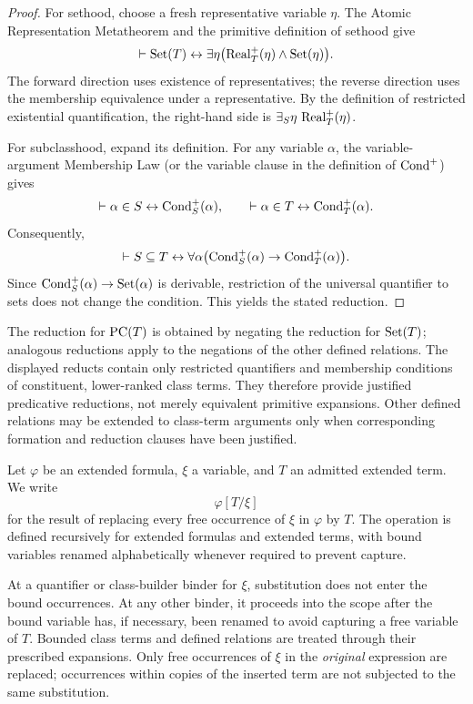 \begin{proof}
For sethood, choose a fresh representative variable \(\eta\).
The Atomic Representation Metatheorem and the primitive definition
of sethood give
\[
\vdash
\operatorname{Set}(T)
\leftrightarrow
\exists\eta\bigl(
\operatorname{Real}^+_T(\eta)\land\operatorname{Set}(\eta)
\bigr).
\]
The forward direction uses existence of representatives; the reverse
direction uses the membership equivalence under a representative.
By the definition of restricted existential quantification, the
right-hand side is \(\exists_S\eta\,\operatorname{Real}^+_T(\eta)\).

For subclasshood, expand its definition. For any variable \(\alpha\),
the variable-argument Membership Law (or the variable clause in
the definition of \(\operatorname{Cond}^+\)) gives
\[
\vdash
\alpha\in S\leftrightarrow\operatorname{Cond}_S^+(\alpha),
\qquad
\vdash
\alpha\in T\leftrightarrow\operatorname{Cond}_T^+(\alpha).
\]
Consequently,
\[
\vdash
S\subseteq T
\leftrightarrow
\forall\alpha\bigl(
\operatorname{Cond}_S^{+}(\alpha)\to\operatorname{Cond}_T^{+}(\alpha)
\bigr).
\]
Since \(\operatorname{Cond}_S^+(\alpha)\to\operatorname{Set}(\alpha)\) is derivable,
restriction of the universal quantifier to sets does not change
the condition. This yields the stated reduction.
\end{proof}

The reduction for \(\operatorname{PC}(T)\) is obtained by negating the reduction
for \(\operatorname{Set}(T)\); analogous reductions apply to the negations of
the other defined relations. The displayed reducts contain only
restricted quantifiers and membership conditions of constituent,
lower-ranked class terms. They therefore provide justified
predicative reductions, not merely equivalent primitive expansions.
Other defined relations may be extended to class-term arguments only
when corresponding formation and reduction clauses have been
justified.


\begin{definition}
\label{def:extended-term-substitution}
Let \(\varphi\) be an extended formula, \(\xi\) a variable,
and \(T\) an admitted extended term. We write
\[
\varphi[T/\xi]
\]
for the result of replacing every free occurrence of \(\xi\)
in \(\varphi\) by \(T\). The operation is defined recursively
for extended formulas and extended terms, with bound variables
renamed alphabetically whenever required to prevent capture.
\end{definition}

At a quantifier or class-builder binder for \(\xi\), substitution
does not enter the bound occurrences. At any other binder, it
proceeds into the scope after the bound variable has, if necessary,
been renamed to avoid capturing a free variable of \(T\). Bounded
class terms and defined relations are treated through their
prescribed expansions. Only free occurrences of \(\xi\) in the
\emph{original} expression are replaced; occurrences within copies
of the inserted term are not subjected to the same substitution.

